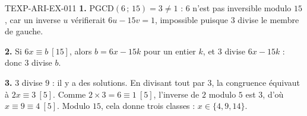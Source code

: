 \begin{corrige}{TEXP-ARI-EX-011}
\textbf{1.} $\mathrm{PGCD}(6\,;\,15)=3\neq1$ : $6$ n'est pas inversible
modulo $15$, car un inverse $u$ vérifierait $6u-15v=1$, impossible puisque $3$
divise le membre de gauche.

\textbf{2.} Si $6x\equiv b\ [15]$, alors $b=6x-15k$ pour un entier $k$, et $3$
divise $6x-15k$ : donc $3$ divise $b$.

\textbf{3.} $3$ divise $9$ : il y a des solutions. En divisant tout par $3$,
la congruence équivaut à $2x\equiv3\ [5]$. Comme $2\times3=6\equiv1\ [5]$,
l'inverse de $2$ modulo $5$ est $3$, d'où $x\equiv9\equiv4\ [5]$. Modulo $15$,
cela donne trois classes : $x\in\{4,9,14\}$.
\end{corrige}
